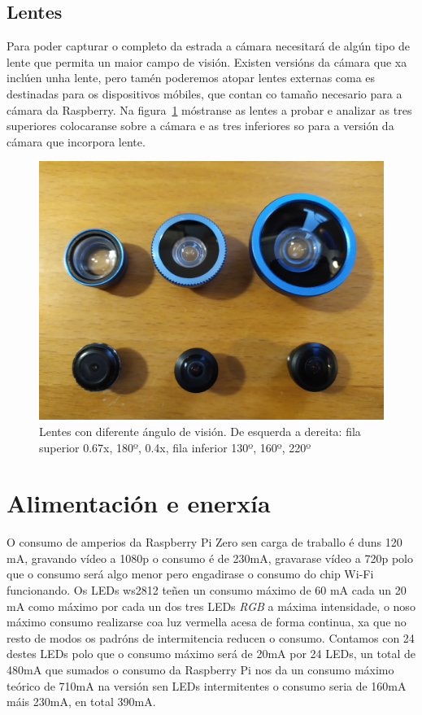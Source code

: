 \subsection{Lentes}
Para poder capturar o completo da estrada a cámara necesitará de algún tipo de lente que permita un maior campo de visión. Existen versións da cámara que xa inclúen unha lente, pero tamén poderemos atopar lentes externas coma es destinadas para os dispositivos móbiles, que contan co tamaño necesario para a cámara da Raspberry. Na figura~\ref{fig:lentes} móstranse as lentes a probar e analizar as tres superiores colocaranse sobre a cámara e as tres inferiores so para a versión da cámara que incorpora lente.
\begin{figure}[tbp]
  \centering
  \includegraphics[scale=.06]{imaxes/lentes.jpg}
  \caption{Lentes con diferente ángulo de visión. De esquerda a dereita: fila superior 0.67x, 180º, 0.4x, fila inferior 130º, 160º, 220º }
  \label{fig:lentes}
\end{figure}



\section{Alimentación e enerxía}
O consumo de amperios da Raspberry Pi Zero sen carga de traballo é duns 120 mA, gravando vídeo a 1080p o consumo é de 230mA, gravarase vídeo a 720p polo que o consumo será algo menor pero engadirase o consumo do chip Wi-Fi funcionando. Os LEDs ws2812 teñen un consumo máximo de 60 mA cada un 20 mA como máximo por cada un dos tres LEDs \emph{RGB} a máxima intensidade, o noso máximo consumo realizarse coa luz vermella acesa de forma continua, xa que no resto de modos os padróns de intermitencia reducen o consumo. Contamos con 24 destes LEDs polo que o consumo máximo será de 20mA por 24 LEDs, un total de 480mA que sumados o consumo da Raspberry Pi nos da un consumo máximo teórico de 710mA na versión sen LEDs intermitentes o consumo seria de 160mA máis 230mA, en total 390mA.


